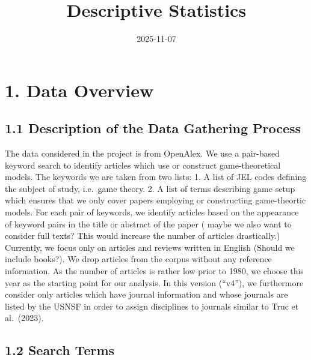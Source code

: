\documentclass[
  12pt,
]{article}
\title{Descriptive Statistics}
\author{}
\date{\vspace{-2.5em}2025-11-07}
\begin{document}
\maketitle

\section{1. Data Overview}\label{data-overview}

\subsection{1.1 Description of the Data Gathering
Process}\label{description-of-the-data-gathering-process}

The data considered in the project is from OpenAlex. We use a pair-based
keyword search to identify articles which use or construct
game-theoretical models. The keywords we are taken from two lists: 1. A
list of JEL codes defining the subject of study, i.e.~game theory. 2. A
list of terms describing game setup which ensures that we only cover
papers employing or constructing game-theortic models. For each pair of
keywords, we identify articles based on the appearance of keyword pairs
in the title or abstract of the paper (\color{red} maybe we also want to
consider full texts? This would increase the number of articles
drastically.\color{black}) Currently, we focus only on articles and
reviews written in English (\color{red}Should we include
books?\color{black}). We drop articles from the corpus without any
reference information. As the number of articles is rather low prior to
1980, we choose this year as the starting point for our analysis. In
this version (``v4''), we furthermore consider only articles which have
journal information and whose journals are listed by the USNSF in order
to assign disciplines to journals similar to Truc et al.~(2023).

\subsection{1.2 Search Terms}\label{search-terms}
\end{document}
